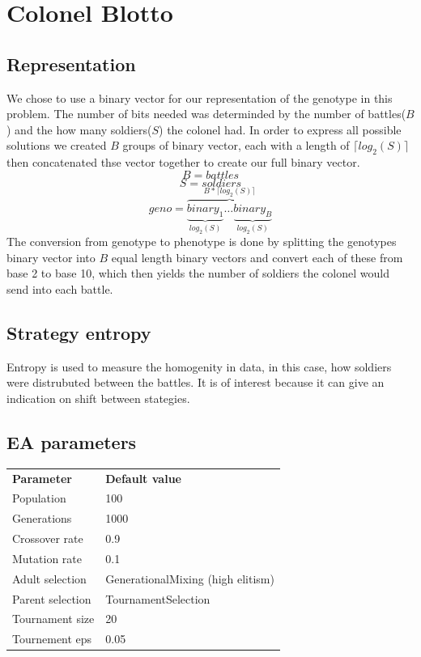 \section{Colonel Blotto}
\subsection{Representation}
We chose to use a binary vector for our representation of the genotype in this problem. The number of bits needed was determinded by the number of battles($B$) and the how many soldiers($S$) the colonel had. In order to express all possible solutions we created $B$ groups of binary vector, each with a length of $\lceil log_2(S)\rceil$ then concatenated thse vector together to create our full binary vector. 
	  \[B = battles\]
		\[S = soldiers\]
		\[
		geno = \overbrace{
		\underbrace{binary_1}_{log_2(S)}\ldots
		\underbrace{binary_B}_{log_2(S)}
		}^{B*\lceil log_2(S)\rceil}
		\]
	The conversion from genotype to phenotype is done by splitting the genotypes binary vector into $B$ equal length binary vectors and convert each of these from base 2 to base 10, which then yields the number of soldiers the colonel would send into each battle. 
	
\subsection{Strategy entropy}
	Entropy is used to measure the homogenity in data, in this case, how soldiers were distrubuted between the	 battles. It is of interest because it can give an indication on shift between stategies.  
\subsection{EA parameters}
	\begin{tabular}{ll}
		\bf{Parameter} & \bf{Default value}\\
		Population & 100\\
		Generations & 1000\\
		Crossover rate & 0.9\\
		Mutation rate & 0.1\\
		Adult selection & GenerationalMixing (high elitism)\\
		Parent selection & TournamentSelection\\
		Tournament size & 20\\
		Tournement eps & 0.05
		
	\end{tabular}
